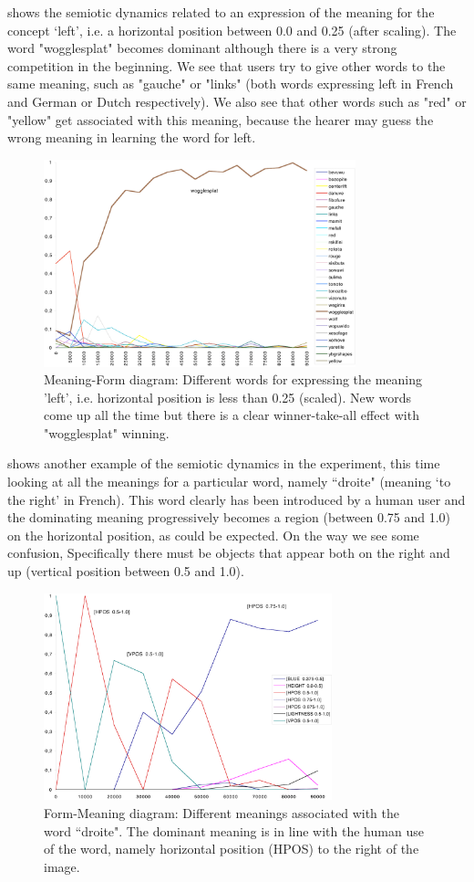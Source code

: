  shows the semiotic dynamics related to an expression of the meaning for the 
concept `left', i.e. a horizontal position 
between 0.0 and 0.25 (after scaling). The word "wogglesplat" becomes dominant
although there is a very strong competition in the beginning. 
We see that users try to give other words to the same meaning, such as "gauche" or "links" (both words expressing left 
in French and German or Dutch respectively). We also see that other words such as "red" or "yellow" get associated with this 
meaning, because the hearer may guess the wrong meaning in learning the word for left. 

\begin{figure}[htbp]
  \centerline{\includegraphics[width=.80\textwidth,height= 6cm]{chap8/figures/wogglesplat}}
\caption{\label{fig:woggle} 
Meaning-Form diagram: Different words for expressing the meaning 'left', i.e. 
horizontal position is less than 0.25 (scaled). 
New words come up all the time but there is a clear winner-take-all effect with "wogglesplat" winning. 
}
\end{figure}

 shows another example of the semiotic dynamics in the experiment, this time looking at all the 
meanings for a particular word, namely ``droite" (meaning `to the right' in French). This word clearly has been introduced
by a human user and the dominating meaning progressively becomes a region (between 0.75 and 1.0) on the horizontal position, 
as could be expected. On the way we see some confusion, Specifically there must be objects that appear both on the right 
and up (vertical position between 0.5 and 1.0). 

\begin{figure}[htbp]
  \centerline{\includegraphics[width=.80\textwidth,height=6cm]{chap8/figures/droite}}
\caption{\label{fig:droite} 
Form-Meaning diagram: Different meanings associated with the word ``droite". The dominant meaning is 
in line with the human use of the word, namely horizontal position (HPOS) to the right of the image.}
\end{figure}

